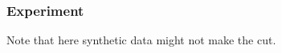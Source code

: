 \documentclass[a4paper]{article}
\begin{document}
\subsubsection{Experiment}

Note that here synthetic data might not make the cut.
\end{document}
